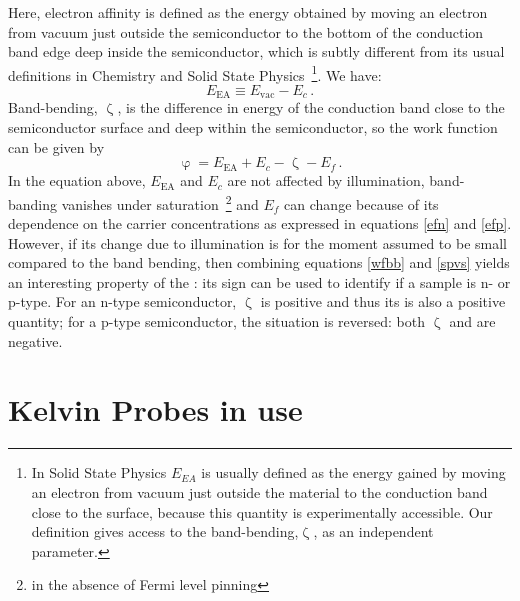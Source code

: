 Here, electron affinity is defined as the energy obtained by moving an electron from vacuum just outside the semiconductor to the bottom of the conduction band edge deep inside the semiconductor, which is subtly different from its usual definitions in Chemistry and Solid State Physics~\footnote{In Solid State Physics $E_{EA}$ is usually defined as the energy gained by moving an electron from vacuum just outside the material to the conduction band close to the surface, because this quantity is experimentally accessible. Our definition gives access to the band-bending,$\upzeta$, as an independent parameter.}. We have:
\begin{equation}
\label{Eea}
	E_{\text{EA}} \equiv E_{\text{vac}} - E_c \, .
\end{equation}
Band-bending, $\upzeta$, is the difference in energy of the conduction band close to the semiconductor surface and deep within the semiconductor, so the work function can be given by
\begin{equation}
\label{wfbb}
	\upvarphi = E_{\text{EA}} + E_c - \upzeta - E_f \, .
\end{equation}
In the equation above, $E_{\text{EA}}$ and $E_c$ are not affected by illumination, band-banding vanishes under saturation~\footnote{in the absence of Fermi level pinning} and $E_f$ can change because of its dependence on the carrier concentrations as expressed in equations \eqref{efn} and \eqref{efp}. However, if its change due to illumination is for the moment assumed to be small compared to the band bending, then combining equations \eqref{wfbb} and \eqref{spvs} yields an interesting property of the \spv{}: its sign can be used to identify if a sample is n- or p-type. For an n-type semiconductor, $\upzeta$ is positive and thus its \spv{} is also a positive quantity; for a p-type semiconductor, the situation is reversed: both $\upzeta$ and \spv{} are negative.


\section{Kelvin Probes in use}

